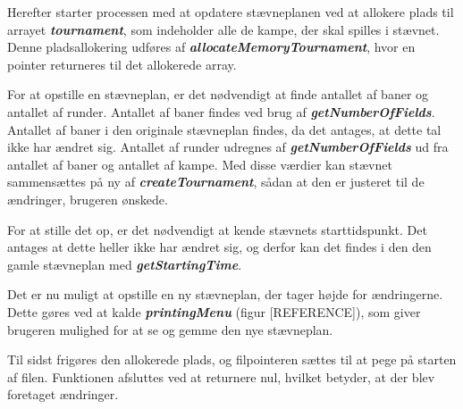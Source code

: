 \par
Herefter starter processen med at opdatere stævneplanen ved at allokere plads til arrayet \textbf{\textit{tournament}}, som indeholder alle de kampe, der skal spilles i stævnet.
Denne pladsallokering udføres af \textbf{\textit{allocateMemoryTournament}}, hvor en pointer returneres til det allokerede array.
\par
For at opstille en stævneplan, er det nødvendigt at finde antallet af baner og antallet af runder. Antallet af baner findes ved brug af \textbf{\textit{getNumberOfFields}}. Antallet af baner i den originale stævneplan findes, da det antages, at dette tal ikke har ændret sig. Antallet af runder udregnes af \textbf{\textit{getNumberOfFields}} ud fra antallet af baner og antallet af kampe. 
Med disse værdier kan stævnet sammensættes på ny af \textbf{\textit{createTournament}}, sådan at den er justeret til de ændringer, brugeren ønskede.
\par
For at stille det op, er det nødvendigt at kende stævnets starttidspunkt.
Det antages at dette heller ikke har ændret sig, og derfor kan det findes i den den gamle stævneplan med \textbf{\textit{getStartingTime}}.
\par
Det er nu muligt at opstille en ny stævneplan, der tager højde for ændringerne. Dette gøres ved at kalde \textbf{\textit{printingMenu}} (figur [REFERENCE]), som giver brugeren mulighed for at se og gemme den nye stævneplan.
\par
Til sidst frigøres den allokerede plads, og filpointeren sættes til at pege på starten af filen. Funktionen afsluttes ved at returnere nul, hvilket betyder, at der blev foretaget ændringer. 
